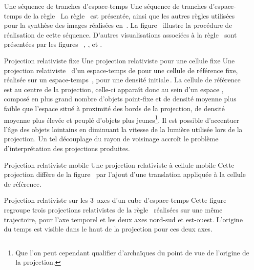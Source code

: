 %
{Une séquence de tranches d'espace-temps}%
{Une séquence de tranches d'espace-temps de la règle~}%
{La règle~ est présentée, ainsi que les autres règles
  utilisées pour la synthèse des images réalisées
  en~. %
  La figure~ illustre la procédure de réalisation
  de cette séquence. %
  D'autres visualisations associées à la règle~ sont
  présentées par les figures~%
  , %
  , %
  et .}

%
{Projection relativiste fixe}%
{Une projection relativiste pour une cellule fixe}%
{Une projection relativiste~ d'un
  espace-temps de  pour une cellule de référence fixe,
  réalisée sur un espace-temps~, pour une densité
  initiale\,\Sundemi. %
  La cellule de référence est au centre de la projection, %
  celle-ci apparaît donc au sein d'un espace ,
  composé en plus grand nombre d'objets point-fixe et %
  de densité moyenne  plus faible %
  que l'espace situé à proximité des bords de la projection, %
  de densité moyenne plus élevée et peuplé d'objets plus jeunes\footnote{%
    Que l'on peut cependant qualifier d'archaïques du point de vue de
    l'origine de la projection.}. %
  Il est possible d'accentuer l'âge des objets lointains en diminuant la
  vitesse de la lumière utilisée lors de la projection. %
  Un tel découplage du rayon de voisinage accroît le problème
  d'interprétation des projections produites.}

%
{Projection relativiste mobile}%
{Une projection relativiste à cellule mo\-bile}%
{Cette projection diffère de la figure~ par
  l'ajout d'une translation appliquée à la cellule de référence.}

%
{}%
{Projection relativiste sur les 3~axes d'un cube d'espace-temps}%
{Cette figure regroupe trois projections relativistes de la
  règle~ réalisées sur une même trajectoire, %
  pour l'axe temporel et les deux axes nord-sud et est-ouest. %
  L'origine du temps est visible dans le haut de la projection pour
  ces deux axes.}

